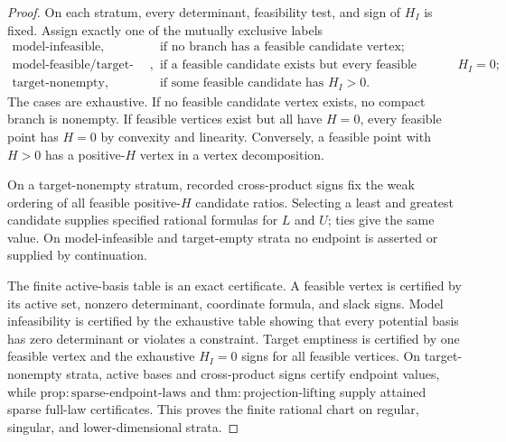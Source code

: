 \documentclass{article}
\begin{document}
\begin{proof}
On each stratum, every determinant, feasibility test, and sign of \(H_I\) is fixed. Assign exactly one of the mutually exclusive labels
\[
 \begin{array}{ll}
 \text{model-infeasible},
   &\text{if no branch has a feasible candidate vertex};\\
 \text{model-feasible/target-empty},
   &\text{if a feasible candidate exists but every feasible candidate has }H_I=0;\\
 \text{target-nonempty},
   &\text{if some feasible candidate has }H_I>0.
 \end{array}
\]
The cases are exhaustive. If no feasible candidate vertex exists, no compact branch is nonempty. If feasible vertices exist but all have \(H=0\), every feasible point has \(H=0\) by convexity and linearity. Conversely, a feasible point with \(H>0\) has a positive-\(H\) vertex in a vertex decomposition.

On a target-nonempty stratum, recorded cross-product signs fix the weak ordering of all feasible positive-\(H\) candidate ratios. Selecting a least and greatest candidate supplies specified rational formulas for \(L\) and \(U\); ties give the same value. On model-infeasible and target-empty strata no endpoint is asserted or supplied by continuation.

The finite active-basis table is an exact certificate. A feasible vertex is certified by its active set, nonzero determinant, coordinate formula, and slack signs. Model infeasibility is certified by the exhaustive table showing that every potential basis has zero determinant or violates a constraint. Target emptiness is certified by one feasible vertex and the exhaustive \(H_I=0\) signs for all feasible vertices. On target-nonempty strata, active bases and cross-product signs certify endpoint values, while \(\mathrm{prop:sparse\text{-}endpoint\text{-}laws}\) and \(\mathrm{thm:projection\text{-}lifting}\) supply attained sparse full-law certificates. This proves the finite rational chart on regular, singular, and lower-dimensional strata.
\end{proof}
\end{document}

